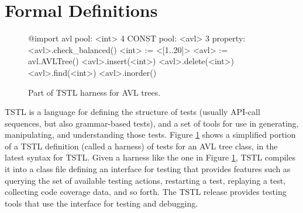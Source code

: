 \section{Formal Definitions}


\begin{figure}[t]
{\scriptsize
\begin{code}
@import avl
\vspace{0.02in}
pool: <int> 4 CONST
pool: <avl> 3
\vspace{0.02in}
property: <avl>.check\_balanced()
\vspace{0.02in}
<int> := <[1..20]>
<avl> := avl.AVLTree()
\vspace{0.02in}
<avl>.insert(<int>)
<avl>.delete(<int>)
<avl>.find(<int>)
<avl>.inorder()
\end{code}
}
\caption{Part of TSTL harness for AVL trees.}
\label{fig:example}
\end{figure}


TSTL \cite{NFM15,ISSTA15} is a language for defining the structure of
tests (usually API-call sequences, but also grammar-based tests), and a set of tools for use in generating,
manipulating, and understanding those tests.  Figure
\ref{fig:example} shows a simplified portion of a TSTL definition
(called a harness) of
tests for an AVL tree class, in the latest syntax for TSTL.
Given a harness
like the one in Figure \ref{fig:example}, TSTL compiles it into a
class file defining an interface for testing that provides features
such as querying the set of available testing actions, restarting a
test, replaying a test, collecting code coverage data, and so forth.
The TSTL release \cite{tstl} provides testing tools that use the
interface for testing and debugging.


